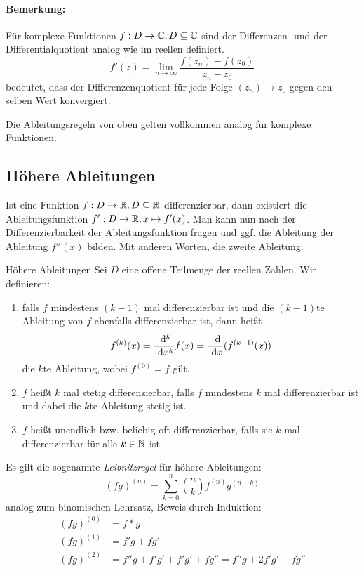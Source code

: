 \paragraph{Bemerkung:}
Für komplexe Funktionen $f:D\rightarrow\mathbb{C}, D\subseteq\mathbb{C}$ sind der Differenzen- und der Differentialquotient analog wie im reellen definiert.
\begin{equation*}
	f'(z)=\lim\limits_{n\to\infty}\frac{f(z_n)-f(z_0)}{z_n-z_0}
\end{equation*}
bedeutet, dass der Differenzenquotient für jede Folge $(z_n)\to z_0$ gegen den selben Wert konvergiert.

Die Ableitungsregeln von oben gelten vollkommen analog für komplexe Funktionen.

\subsection{Höhere Ableitungen}
Ist eine Funktion $f:D\rightarrow\mathbb{R}, D\subseteq\mathbb{R}$ differenzierbar, dann existiert die Ableitungsfunktion $f':D\rightarrow\mathbb{R},x\mapsto f'(x)$. Man kann nun nach der Differenzierbarkeit der Ableitungsfunktion fragen und ggf. die Ableitung der Ableitung $f''(x)$ bilden. Mit anderen Worten, die zweite Ableitung.

\begin{definition}{Höhere Ableitungen}
	Sei $D$ eine offene Teilmenge der reellen Zahlen. Wir definieren:
	\begin{enumerate}
		\item falls $f$ mindestens $(k-1)$ mal differenzierbar ist und die $(k-1)$te Ableitung von $f$ ebenfalls differenzierbar ist, dann heißt
		\begin{equation*}
			f^{(k)}(x)=\frac{\ \operatorname{d}\!^k}{\ \operatorname{d}\! x^k}f(x)=\frac{\ \operatorname{d}\!}{\ \operatorname{d}\! x}(f^{(k-1)}(x))
		\end{equation*}
		die $k$te Ableitung, wobei $f^{(0)}=f$ gilt.
		\item $f$ heißt $k$ mal stetig differenzierbar, falls $f$ mindestens $k$ mal differenzierbar ist und dabei die $k$te Ableitung stetig ist.
		\item $f$ heißt unendlich bzw. beliebig oft differenzierbar, falls sie $k$ mal differenzierbar für alle $k\in\mathbb{N}$ ist.
	\end{enumerate}
\end{definition}

Es gilt die sogenannte \emph{Leibnitzregel} für höhere Ableitungen:
\begin{equation*}
	(fg)^{(n)}=\sum\limits_{k=0}^n \binom nk f^{(n)}g^{(n-k)}
\end{equation*}
analog zum binomischen Lehrsatz, Beweis durch Induktion:
\begin{align*}
	(fg)^{(0)}&=f*g\\
	(fg)^{(1)}&=f'g+fg'\\
	(fg)^{(2)}&=f''g+f'g'+f'g'+fg''=f''g+2f'g'+fg''
\end{align*}

